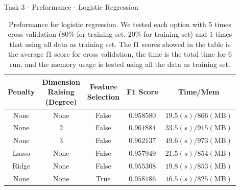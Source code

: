 \documentclass{beamer}
\begin{document}
\begin{frame}{Task 3 - Preformance - Logistic Regression}

  \begin{table}[H]
    \centering
    \begin{tabular}{|c|c|c|c|c|}
      \hline
      Penalty & \makecell{Dimension                                                 \\ Raising \\ (Degree)} & \makecell{Feature \\ Selection} & F1 Score & Time/Mem \\
      \hline
      None    & None                & False & $0.958580$ & $19.5(s)/866(\text{MB})$ \\
      \hline
      None    & $2$                 & False & $0.961884$ & $33.5(s)/915(\text{MB})$ \\
      \hline
      None    & $3$                 & False & $0.962137$ & $49.6(s)/973(\text{MB})$ \\
      \hline
      Lasso   & None                & False & $0.957949$ & $21.5(s)/854(\text{MB})$ \\
      \hline
      Ridge   & None                & False & $0.955308$ & $19.8(s)/853(\text{MB})$ \\
      \hline
      None    & None                & True  & $0.958186$ & $16.5(s)/825(\text{MB})$ \\
      \hline
    \end{tabular}
    \caption{Preformance for logistic regression. We tested each option with $5$ times cross validation ($80\%$ for training set, $20\%$ for training set) and $1$ times that using all data as training set. The f1 scores showed in the table is the average f1 score for cross validation, the time is the total time for $6$ run, and the memory usage is tested using all the data as training set.}
  \end{table}

\end{frame}
\end{document}
